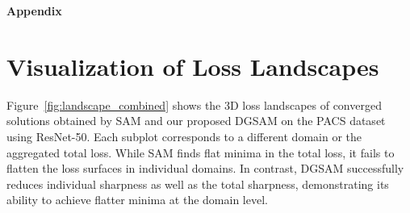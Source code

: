 \documentclass{article}
\theoremstyle{plain}
\theoremstyle{definition}
\theoremstyle{remark}
\begin{document}

 
 











\newpage
\appendix
\textbf{\Large{Appendix}}

\section{Visualization of Loss Landscapes}\label{app:loss-landscape}

Figure~\ref{fig:landscape_combined} shows the 3D loss landscapes of converged solutions obtained by SAM and our proposed DGSAM on the PACS dataset using ResNet-50. Each subplot corresponds to a different domain or the aggregated total loss. While SAM finds flat minima in the total loss, it fails to flatten the loss surfaces in individual domains. In contrast, DGSAM successfully reduces individual sharpness as well as the total sharpness, demonstrating its ability to achieve flatter minima at the domain level. 
\end{document}
